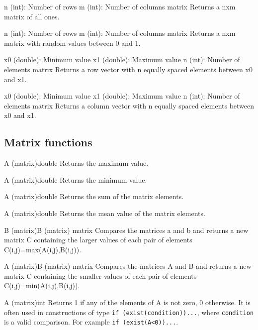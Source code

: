 {n (int): Number of rows\newline
m (int): Number of columns}
{matrix}
{Returns a nxm matrix of all ones.}

{n (int): Number of rows\newline
m (int): Number of columns}
{matrix}
{Returns a nxm matrix with random values between 0 and 1.}

{x0 (double): Minimum value\newline
x1 (double): Maximum value\newline
n (int): Number of elements}
{matrix}
{Returns a row vector with n equally spaced elements between x0 and x1.}

{x0 (double): Minimum value\newline
x1 (double): Maximum value\newline
n (int): Number of elements}
{matrix}
{Returns a column vector with n equally spaced elements between x0 and x1.}

\subsection{Matrix functions}

{A (matrix)}{double}
{Returns the maximum value.}

{A (matrix)}{double}
{Returns the minimum value.}

{A (matrix)}{double}
{Returns the sum of the matrix elements.}

{A (matrix)}{double}
{Returns the mean value of the matrix elements.}

{B (matrix)\newline B (matrix)}
{matrix}
{Compares the matrices a and b and returns a new matrix C containing the larger values of each pair of 
elements C(i,j)=max(A(i,j),B(i,j)). }

{A (matrix)\newline B (matrix)}
{matrix}
{Compares the matrices A and B and returns a new matrix C containing the smaller values of each pair of 
elements C(i,j)=min(A(i,j),B(i,j)). }

{A (matrix)}{int}
{Returns 1 if any of the elements of A is not zero, 0 otherwise. It is often used in constructions
of type \texttt{if (exist(condition))...}, where \texttt{condition} is a valid comparison. For example
\texttt{if (exist(A<0))...}.}

